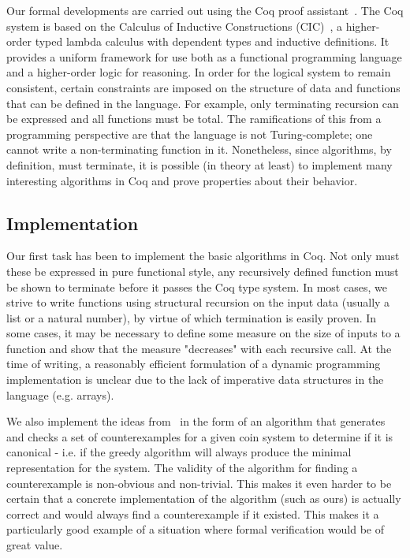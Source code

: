 \documentclass{acm_proc_article-sp}
\begin{document}
Our formal developments are  carried out using the Coq proof assistant~\cite{coq12}. The Coq system is based on 
the Calculus of Inductive Constructions (CIC)~\cite{paulin93}, a higher-order typed lambda calculus with dependent types and inductive definitions. It provides a uniform framework for use  both as a functional programming language and a higher-order logic for reasoning. In order for the logical system to remain consistent, certain constraints are imposed on the structure of data  and functions that can be defined in the language. For example, only terminating recursion can be expressed and all functions must be total. The ramifications of this from a programming perspective are that the language is not Turing-complete; one cannot write a non-terminating function in it. Nonetheless, since algorithms, by definition, must terminate, it is possible (in theory at least) to implement many interesting algorithms in Coq and prove properties about their behavior. 

\subsection{Implementation}

Our first task has been to implement the basic algorithms in Coq. Not only must these be expressed in pure functional style, any recursively defined function must be shown to terminate before it passes the Coq type system. In most cases, we strive to write functions using structural recursion on the input data (usually a list or a natural number), by virtue of which termination is easily proven. In some cases, it may be necessary to define some measure on the size of inputs to a function and show that the measure "decreases" with each recursive call. At the time of writing, a reasonably efficient formulation of a dynamic programming implementation is unclear due to the lack of imperative data structures in the language (e.g. arrays).

We also implement the ideas from~\cite{pearson94} in the form of an algorithm that generates and checks a set of counterexamples for a given coin system to determine if it is canonical - i.e. if the greedy algorithm will always produce the minimal representation for the system. The validity of the algorithm for finding a counterexample is non-obvious and non-trivial. This makes it even harder to be certain that a concrete implementation of the algorithm (such as ours) is actually correct and would always find a counterexample if it existed. This makes it a particularly good example of a situation where formal verification would be of great value. 
\end{document}

